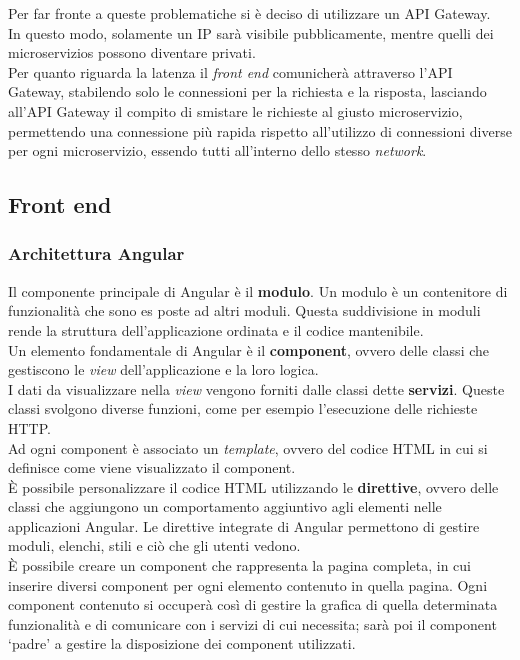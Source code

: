 \noindent Per far fronte a queste problematiche si è deciso di utilizzare un \gls{API Gateway}.\\
In questo modo, solamente un \gls{IP} sarà visibile pubblicamente, mentre quelli dei \glspl{microservizio} possono diventare privati.\\
Per quanto riguarda la latenza il \textit{front end} comunicherà attraverso l'\gls{API Gateway}, stabilendo solo le connessioni per la richiesta e la risposta, lasciando all'\gls{API Gateway} il compito di smistare le richieste al giusto \gls{microservizio}, permettendo una connessione più rapida rispetto  all'utilizzo di connessioni diverse per ogni \gls{microservizio}, essendo tutti all'interno dello stesso \textit{network}.

\subsection{Front end}
\subsubsection{Architettura Angular}
Il componente principale di Angular è il \textbf{modulo}. Un modulo è un contenitore di funzionalità che sono es
poste ad altri moduli. Questa suddivisione in moduli rende la struttura dell'applicazione ordinata e il codice mantenibile.\\
Un elemento fondamentale di Angular è il \textbf{component}, ovvero delle classi che gestiscono le \textit{view} dell'applicazione e la loro logica.\\
I dati da visualizzare nella \textit{view} vengono forniti dalle classi dette \textbf{servizi}. Queste classi svolgono diverse funzioni, come per esempio  l'esecuzione delle richieste HTTP.\\  
Ad ogni component è associato un \textit{template}, ovvero del codice HTML in cui si definisce come viene visualizzato il component.\\
È possibile personalizzare il codice HTML utilizzando le \textbf{direttive}, ovvero delle classi che aggiungono un comportamento aggiuntivo agli elementi nelle applicazioni Angular. Le direttive integrate di Angular permettono di gestire moduli, elenchi, stili e ciò che gli utenti vedono.\\
È possibile creare un component che rappresenta la pagina completa, in cui inserire diversi component per ogni elemento contenuto in quella pagina.
Ogni component contenuto si occuperà così di gestire la grafica di quella determinata funzionalità e di comunicare con i servizi di cui necessita; sarà poi il component \enquote*{padre} a gestire la disposizione dei component utilizzati. 
